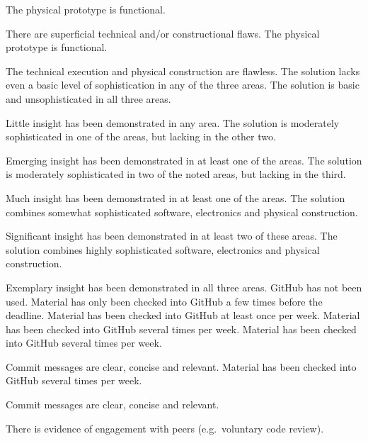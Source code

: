 \documentclass{../fal_assignment}
\begin{document}
\begin{markingrubric}
        \grade The physical prototype is functional.
            \par There are superficial technical and/or constructional flaws.
        \grade The physical prototype is functional.
            \par The technical execution and physical construction are flawless.
        \grade\fail The solution lacks even a basic level of sophistication in any of the three areas.
        \grade The solution is basic and unsophisticated in all three areas.
            \par Little insight has been demonstrated in any area.
        \grade The solution is moderately sophisticated in one of the areas, but lacking in the other two.
            \par Emerging insight has been demonstrated in at least one of the areas.
        \grade The solution is moderately sophisticated in two of the noted areas, but lacking in the third.
            \par Much insight has been demonstrated in at least one of the areas.
        \grade The solution combines somewhat sophisticated software, electronics and physical construction.
            \par Significant insight has been demonstrated in at least two of these areas.
        \grade The solution combines highly sophisticated software, electronics and physical construction.
            \par Exemplary insight has been demonstrated in all three areas.
        \grade\fail GitHub has not been used.
        \grade Material has only been checked into GitHub a few times before the deadline.
        \grade Material has been checked into GitHub at least once per week.
        \grade Material has been checked into GitHub several times per week.
        \grade Material has been checked into GitHub several times per week.
            \par Commit messages are clear, concise and relevant.
        \grade Material has been checked into GitHub several times per week.
            \par Commit messages are clear, concise and relevant.
            \par There is evidence of engagement with peers (e.g.\ voluntary code review).
\end{markingrubric}
\end{document}
